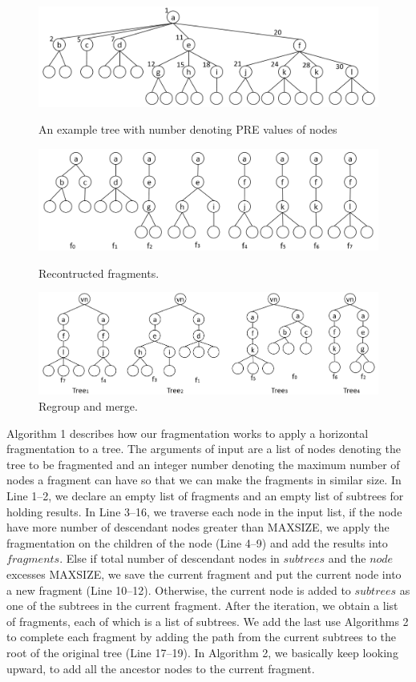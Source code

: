 \begin{figure}[!t] 
	\includegraphics[scale=0.38]{figures/fragment1}
	\caption{An example tree with number denoting PRE values of nodes}
	\label{fig:frag1}
	\includegraphics[scale=0.38]{figures/fragment2}
	\caption{Recontructed fragments.}
	\label{fig:frag2}
	\includegraphics[scale=0.35]{figures/fragment3}
	\caption{Regroup and merge.}
	\label{fig:frag3}
\end{figure}



Algorithm 1 describes how our fragmentation works to apply a horizontal
fragmentation to a tree. The arguments of input are a list of nodes denoting the
tree to be fragmented and an integer number denoting the maximum number of nodes
a fragment can have so that we can make the fragments in similar size.   In Line
1--2, we declare an empty list of fragments and an empty list of subtrees for
holding results. In Line 3--16, we traverse each node in the input list, if the
node have more number of descendant nodes greater than MAXSIZE, we apply the
fragmentation on the children of the node (Line 4--9) and add the results into
$fragments$. Else if total number of descendant nodes in $subtrees$ and the
$node$ excesses MAXSIZE, we save the current fragment and put the current node
into a new fragment (Line 10--12). Otherwise, the current node is added to
$subtrees$ as one of the subtrees in the current fragment. After the iteration,
we obtain a list of fragments, each of which is a list of subtrees. We add the
last use Algorithms 2 to complete each fragment by adding the path from the
current subtrees to the root of the original tree (Line 17--19). In Algorithm 2,
we basically keep looking upward, to add all the ancestor nodes to the current
fragment.

